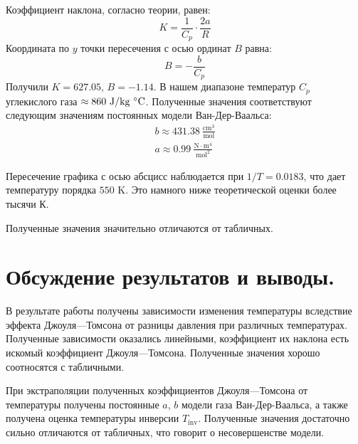 \documentclass[a4paper,12pt]{report}
\begin{document}
\begin{multicols}{2}
        Коэффициент наклона, согласно теории, равен:
        \begin{equation*}
            K=\frac{1}{C_p}\cdot \frac{2a}{R}
        \end{equation*}
        Координата по $y$ точки пересечения с осью ординат $B$ равна:
        \begin{equation*}
            B=-\frac{b}{C_p}
        \end{equation*}
        Получили $K=627.05$, $B=-1.14$. В нашем диапазоне температур $C_p$ углекислого газа $\approx 860\ \text{J}/\text{kg}\ \celsius$. Полученные значения соответствуют следующим значениям постоянных модели Ван-Дер-Ваальса:
        \begin{gather*}
            b\approx 431.38 \  \frac{\text{cm}^3}{\text{mol}}\\
            a\approx 0.99 \ \frac{\text{N}\cdot \text{m}^4}{\text{mol}^2}
        \end{gather*}

        Пересечение графика с осью абсцисс наблюдается при $1/T=0.0183$, что дает температуру порядка $550$ K. Это намного ниже теоретической оценки более тысячи К.

        Полученные значения значительно отличаются от табличных.
        \section{Обсуждение результатов и выводы.}
        В результате работы получены зависимости изменения температуры вследствие эффекта Джоуля---Томсона от разницы давления при различных температурах. Полученные зависимости оказались линейными, коэффициент их наклона есть искомый коэффициент Джоуля---Томсона. Полученные значения хорошо соотносятся с табличными.

        При экстраполяции полученных коэффициентов Джоуля---Томсона от температуры получены постоянные $a$, $b$ модели газа Ван-Дер-Ваальса, а также получена оценка температуры инверсии $T_\text{inv}$. Полученные значения достаточно сильно отличаются от табличных, что говорит о несовершенстве модели.
    \end{multicols}
    \newpage
\end{document}
